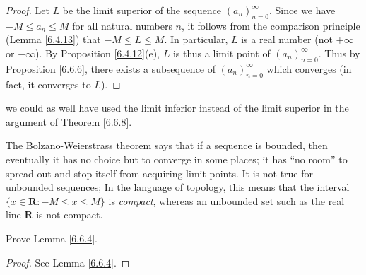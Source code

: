 \begin{proof}
Let \(L\) be the limit superior of the sequence \((a_n)_{n = 0}^\infty\).
Since we have \(-M \leq a_n \leq M\) for all natural numbers \(n\), it follows from the comparison principle (Lemma \ref{6.4.13}) that \(-M \leq L \leq M\).
In particular, \(L\) is a real number (not \(+\infty\) or \(-\infty\)).
By Proposition \ref{6.4.12}(e), \(L\) is thus a limit point of \((a_n)_{n = 0}^\infty\).
Thus by Proposition \ref{6.6.6}, there exists a subsequence of \((a_n)_{n = 0}^\infty\) which converges
(in fact, it converges to \(L\)).
\end{proof}

\begin{note}
we could as well have used the limit inferior instead of the limit superior in the argument of Theorem \ref{6.6.8}.
\end{note}

\begin{remark}\label{6.6.9}
The Bolzano-Weierstrass theorem says that if a sequence is bounded, then eventually it has no choice but to converge in some places;
it has ``no room'' to spread out and stop itself from acquiring limit points.
It is not true for unbounded sequences;
In the language of topology, this means that the interval \(\{x \in \mathbf{R} : -M \leq x \leq M\}\) is \emph{compact}, whereas an unbounded set such as the real line \(\mathbf{R}\) is not compact.
\end{remark}

\exercisesection

\begin{exercise}\label{ex 6.6.1}
Prove Lemma \ref{6.6.4}.
\end{exercise}

\begin{proof}
See Lemma \ref{6.6.4}.
\end{proof}